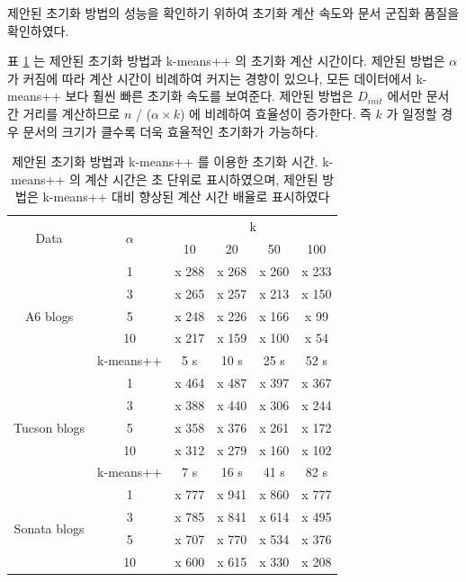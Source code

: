 \documentclass[11pt]{article}
\renewcommand\arraystretch{0.8} \setlength\minrowclearance{0.8pt}
\begin{document}
제안된 초기화 방법의 성능을 확인하기 위하여 초기화 계산 속도와 문서 군집화 품질을 확인하였다.

표 \ref{tab:performance_initialization_time} 는 제안된 초기화 방법과 k-means++ 의 초기화 계산 시간이다.
제안된 방법은 $\alpha$ 가 커짐에 따라 계산 시간이 비례하여 커지는 경향이 있으나, 모든 데이터에서 k-means++ 보다 훨씬 빠른 초기화 속도를 보여준다.
제안된 방법은 $D_{init}$ 에서만 문서 간 거리를 계산하므로 $n$ / ($\alpha \times k$) 에 비례하여 효율성이 증가한다.
즉 $k$ 가 일정할 경우 문서의 크기가 클수록 더욱 효율적인 초기화가 가능하다.

\begin{table}[H]
\small
\centering
\caption{제안된 초기화 방법과 k-means++ 를 이용한 초기화 시간. k-means++ 의 계산 시간은 초 단위로 표시하였으며, 제안된 방법은 k-means++ 대비 향상된 계산 시간 배율로 표시하였다}
\label{tab:performance_initialization_time}
\renewcommand{\arraystretch}{.67}
\begin{tabular}{|c|c|c|c|c|c|}
\hline
\multirow{2}{*}{Data} & \multirow{2}{*}{$\alpha$} & \multicolumn{4}{c|}{k} \\ \cline{3-6} 
 &  & 10 & 20 & 50 & 100 \\ \hline
\multirow{5}{*}{A6 blogs} & 1 & x 288 & x 268 & x 260 & x 233 \\ \cline{2-6} 
 & 3 & x 265 & x 257 & x 213 & x 150 \\ \cline{2-6} 
 & 5 & x 248 & x 226 & x 166 & x 99 \\ \cline{2-6} 
 & 10 & x 217 & x 159 & x 100 & x 54 \\ \cline{2-6} 
 & k-means++ & 5 s & 10 s & 25 s & 52 s \\ \hline
\multirow{5}{*}{Tucson blogs} & 1 & x 464 & x 487 & x 397 & x 367 \\ \cline{2-6} 
 & 3 & x 388 & x 440 & x 306 & x 244 \\ \cline{2-6} 
 & 5 & x 358 & x 376 & x 261 & x 172 \\ \cline{2-6} 
 & 10 & x 312 & x 279 & x 160 & x 102 \\ \cline{2-6} 
 & k-means++ & 7 s & 16 s & 41 s & 82 s \\ \hline
\multirow{5}{*}{Sonata blogs} & 1 & x 777 & x 941 & x 860 & x 777 \\ \cline{2-6} 
 & 3 & x 785 & x 841 & x 614 & x 495 \\ \cline{2-6} 
 & 5 & x 707 & x 770 & x 534 & x 376 \\ \cline{2-6} 
 & 10 & x 600 & x 615 & x 330 & x 208 \\ \cline{2-6} 

\end{tabular}
\end{table}
\end{document}
